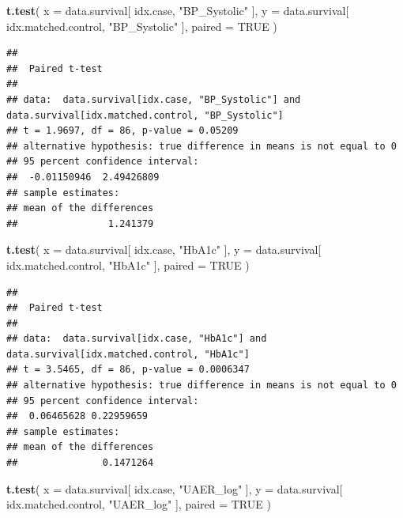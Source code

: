 \documentclass[]{article}
\newenvironment{Shaded}{\begin{snugshade}}{\end{snugshade}}
\newcommand{\DataTypeTok}[1]{\textcolor[rgb]{0.13,0.29,0.53}{#1}}
\newcommand{\KeywordTok}[1]{\textcolor[rgb]{0.13,0.29,0.53}{\textbf{#1}}}
\newcommand{\NormalTok}[1]{#1}
\newcommand{\OtherTok}[1]{\textcolor[rgb]{0.56,0.35,0.01}{#1}}
\newcommand{\StringTok}[1]{\textcolor[rgb]{0.31,0.60,0.02}{#1}}
\begin{document}
\begin{Shaded}
\begin{Highlighting}[]
\KeywordTok{t.test}\NormalTok{( }
  \DataTypeTok{x =}\NormalTok{ data.survival[ idx.case, }\StringTok{"BP_Systolic"}\NormalTok{ ],}
  \DataTypeTok{y =}\NormalTok{ data.survival[ idx.matched.control, }\StringTok{"BP_Systolic"}\NormalTok{ ],}
  \DataTypeTok{paired =} \OtherTok{TRUE}
\NormalTok{)}
\end{Highlighting}
\end{Shaded}

\begin{verbatim}
## 
##  Paired t-test
## 
## data:  data.survival[idx.case, "BP_Systolic"] and data.survival[idx.matched.control, "BP_Systolic"]
## t = 1.9697, df = 86, p-value = 0.05209
## alternative hypothesis: true difference in means is not equal to 0
## 95 percent confidence interval:
##  -0.01150946  2.49426809
## sample estimates:
## mean of the differences 
##                1.241379
\end{verbatim}

\begin{Shaded}
\begin{Highlighting}[]
\KeywordTok{t.test}\NormalTok{(}
  \DataTypeTok{x =}\NormalTok{ data.survival[ idx.case, }\StringTok{"HbA1c"}\NormalTok{ ],}
  \DataTypeTok{y =}\NormalTok{ data.survival[ idx.matched.control, }\StringTok{"HbA1c"}\NormalTok{ ],}
  \DataTypeTok{paired =} \OtherTok{TRUE}
\NormalTok{)}
\end{Highlighting}
\end{Shaded}

\begin{verbatim}
## 
##  Paired t-test
## 
## data:  data.survival[idx.case, "HbA1c"] and data.survival[idx.matched.control, "HbA1c"]
## t = 3.5465, df = 86, p-value = 0.0006347
## alternative hypothesis: true difference in means is not equal to 0
## 95 percent confidence interval:
##  0.06465628 0.22959659
## sample estimates:
## mean of the differences 
##               0.1471264
\end{verbatim}

\begin{Shaded}
\begin{Highlighting}[]
\KeywordTok{t.test}\NormalTok{(}
  \DataTypeTok{x =}\NormalTok{ data.survival[ idx.case, }\StringTok{"UAER_log"}\NormalTok{ ],}
  \DataTypeTok{y =}\NormalTok{ data.survival[ idx.matched.control, }\StringTok{"UAER_log"}\NormalTok{ ],}
  \DataTypeTok{paired =} \OtherTok{TRUE}
\NormalTok{)}
\end{Highlighting}
\end{Shaded}
\end{document}

